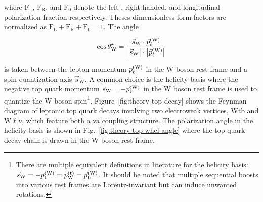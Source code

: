 where $\mathrm{F}_\mathrm{L}$, $\mathrm{F}_\mathrm{R}$, and $\mathrm{F}_{0}$ denote the left-, right-handed, and longitudinal polarization fraction respectively. Theses dimensionless form factors are normalized as $\mathrm{F}_\mathrm{L}+\mathrm{F}_\mathrm{R}+\mathrm{F}_{0}=1$. The angle 

\begin{equation}
\cos\theta^\star_\mathrm{W}=\frac{\vec{s}_\mathrm{W}\cdot\vec{p}_{\ell}^\scriptn{\mathrm{(W)}}}{\big|\vec{s}_\mathrm{W}\big|\cdot\big|\vec{p}_{\ell}^\scriptn{\mathrm{(W)}}\big|}
\end{equation}

is taken between the lepton momentum $\vec{p}_{\ell}^\scriptn{\mathrm{(W)}}$ in the W boson rest frame and a spin quantization axis $\vec{s}_\mathrm{W}$. A common choice is the helicity basis where the negative top quark momentum $\vec{s}_\mathrm{W}=-\vec{p}_\mathrm{t}^\scriptn{\mathrm{(W)}}$ in the $\mathrm{W}$ boson rest frame is used to quantize the W boson spin\footnote{There are multiple equivalent definitions in literature for the helicity basis: $\vec{s}_\mathrm{W}=-\vec{p}_\mathrm{t}^\scriptn{\mathrm{(W)}}=\vec{p}_\mathrm{W}^\scriptn{\mathrm{(t)}}=\vec{p}_\mathrm{b}^\scriptn{\mathrm{(W)}}$. It should be noted that multiple sequential boosts into various rest frames are Lorentz-invariant but can induce unwanted rotations.}. Figure~\ref{fig:theory-top-decay} shows the Feynman diagram of leptonic top quark decays involving two electroweak vertices, $\mathrm{Wtb}$ and $\mathrm{W}\ell\nu$, which feature both a \gls{va} coupling structure. The polarization angle in the helicity basis is shown in Fig.~\ref{fig:theory-top-whel-angle} where the top quark decay chain is drawn in the W boson rest frame.


